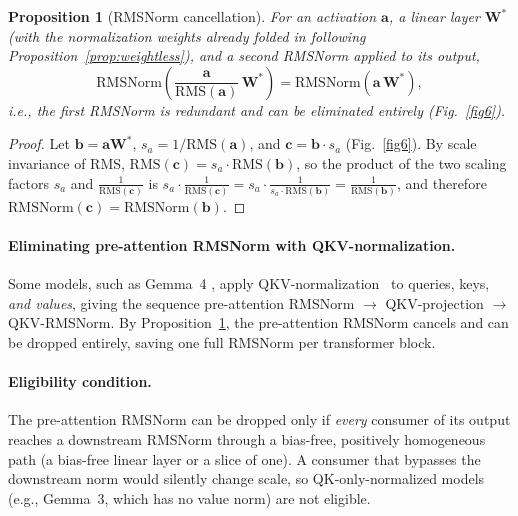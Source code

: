 \documentclass{article}
\newtheorem{proposition}{Proposition}
\begin{document}
\begin{proposition}[RMSNorm cancellation]\label{prop:rms-cancel}
For an activation $\mathbf{a}$, a linear layer $\mathbf{W}^*$ (with the normalization weights
already folded in following Proposition~\ref{prop:weightless}), and a second RMSNorm
applied to its output,
\[
  \mathrm{RMSNorm}\!\left(\frac{\mathbf{a}}{\mathrm{RMS}(\mathbf{a})}\,\mathbf{W}^*\right)
  = \mathrm{RMSNorm}\!\left(\mathbf{a}\,\mathbf{W}^*\right),
\]
i.e., the first RMSNorm is redundant and can be eliminated entirely (Fig.~\ref{fig6}).
\end{proposition}
\begin{proof}
Let $\mathbf{b} = \mathbf{a}\mathbf{W}^*$, $s_a = 1/\mathrm{RMS}(\mathbf{a})$, and
$\mathbf{c} = \mathbf{b} \cdot s_a$ (Fig.~\ref{fig6}). By scale invariance of RMS,
$\mathrm{RMS}(\mathbf{c}) = s_a \cdot \mathrm{RMS}(\mathbf{b})$, so the product of the two scaling factors $s_a$
and $\frac{1}{\mathrm{RMS}(\mathbf{c})}$ is $s_a \cdot \frac{1}{\mathrm{RMS}(\mathbf{c})}
= s_a \cdot \frac{1}{s_a \cdot \mathrm{RMS}(\mathbf{b})} = \frac{1}{\mathrm{RMS}(\mathbf{b})}$,
and therefore $\mathrm{RMSNorm}(\mathbf{c}) = \mathrm{RMSNorm}(\mathbf{b})$.
\end{proof}
\paragraph{Eliminating pre-attention RMSNorm with QKV-normalization.}
Some models, such as Gemma~4 \citep{gemma4}, apply QKV-normalization~\citep{qkv-norm} to
queries, keys, \emph{and values}, giving the sequence
pre-attention RMSNorm $\to$ QKV-projection $\to$ QKV-RMSNorm.
By Proposition~\ref{prop:rms-cancel}, the pre-attention RMSNorm cancels and can be
dropped entirely, saving one full RMSNorm per transformer block.

\paragraph{Eligibility condition.}
The pre-attention RMSNorm can be dropped only if \emph{every} consumer of its output
reaches a downstream RMSNorm through a bias-free, positively homogeneous path (a
bias-free linear layer or a slice of one). A consumer that bypasses the downstream norm
would silently change scale, so QK-only-normalized models (e.g., Gemma~3, which has no
value norm) are not eligible.
\end{document}
